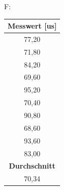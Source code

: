 F:
\begin{table}[H]
\begin{tabular}{|c|}
\hline
\textbf{Messwert {[}us{]}} \\ \hline
77,20                      \\ \hline
71,80                      \\ \hline
84,20                      \\ \hline
69,60                      \\ \hline
95,20                      \\ \hline
70,40                      \\ \hline
90,80                      \\ \hline
68,60                      \\ \hline
93,60                      \\ \hline
83,00                      \\ \hline
\textbf{Durchschnitt}      \\ \hline
70,34                      \\ \hline
\end{tabular}
\end{table}



